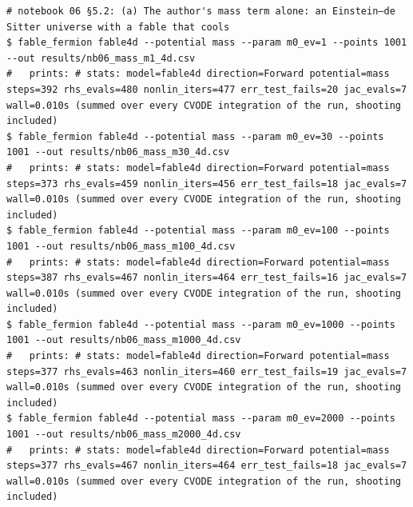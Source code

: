 \begin{Verbatim}
# notebook 06 §5.2: (a) The author's mass term alone: an Einstein–de Sitter universe with a fable that cools
$ fable_fermion fable4d --potential mass --param m0_ev=1 --points 1001 --out results/nb06_mass_m1_4d.csv
#   prints: # stats: model=fable4d direction=Forward potential=mass steps=392 rhs_evals=480 nonlin_iters=477 err_test_fails=20 jac_evals=7 wall=0.010s (summed over every CVODE integration of the run, shooting included)
$ fable_fermion fable4d --potential mass --param m0_ev=30 --points 1001 --out results/nb06_mass_m30_4d.csv
#   prints: # stats: model=fable4d direction=Forward potential=mass steps=373 rhs_evals=459 nonlin_iters=456 err_test_fails=18 jac_evals=7 wall=0.010s (summed over every CVODE integration of the run, shooting included)
$ fable_fermion fable4d --potential mass --param m0_ev=100 --points 1001 --out results/nb06_mass_m100_4d.csv
#   prints: # stats: model=fable4d direction=Forward potential=mass steps=387 rhs_evals=467 nonlin_iters=464 err_test_fails=16 jac_evals=7 wall=0.010s (summed over every CVODE integration of the run, shooting included)
$ fable_fermion fable4d --potential mass --param m0_ev=1000 --points 1001 --out results/nb06_mass_m1000_4d.csv
#   prints: # stats: model=fable4d direction=Forward potential=mass steps=377 rhs_evals=463 nonlin_iters=460 err_test_fails=19 jac_evals=7 wall=0.010s (summed over every CVODE integration of the run, shooting included)
$ fable_fermion fable4d --potential mass --param m0_ev=2000 --points 1001 --out results/nb06_mass_m2000_4d.csv
#   prints: # stats: model=fable4d direction=Forward potential=mass steps=377 rhs_evals=467 nonlin_iters=464 err_test_fails=18 jac_evals=7 wall=0.010s (summed over every CVODE integration of the run, shooting included)


\end{Verbatim}
